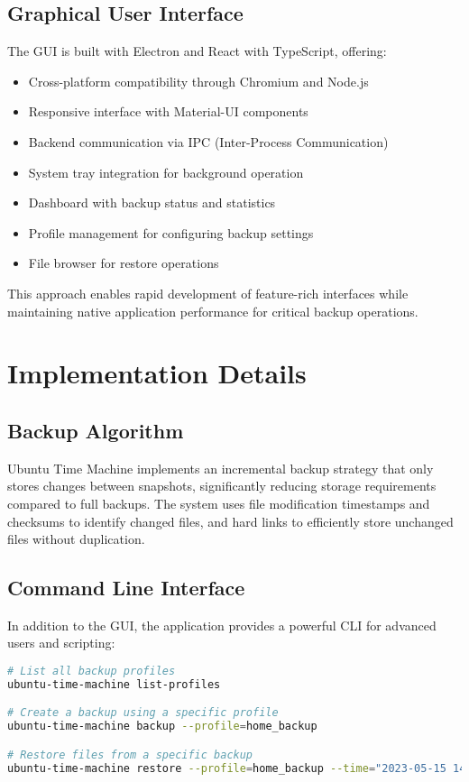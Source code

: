 \documentclass[journal,twoside,10pt]{IEEEtran}
\begin{document}
\subsection{Graphical User Interface}
The GUI is built with Electron and React with TypeScript, offering:
\begin{itemize}
    \item Cross-platform compatibility through Chromium and Node.js
    \item Responsive interface with Material-UI components
    \item Backend communication via IPC (Inter-Process Communication)
    \item System tray integration for background operation
    \item Dashboard with backup status and statistics
    \item Profile management for configuring backup settings
    \item File browser for restore operations
\end{itemize}

This approach enables rapid development of feature-rich interfaces while maintaining native application performance for critical backup operations.

\section{Implementation Details}
\subsection{Backup Algorithm}
Ubuntu Time Machine implements an incremental backup strategy that only stores changes between snapshots, significantly reducing storage requirements compared to full backups. The system uses file modification timestamps and checksums to identify changed files, and hard links to efficiently store unchanged files without duplication.

\subsection{Command Line Interface}
In addition to the GUI, the application provides a powerful CLI for advanced users and scripting:

\begin{lstlisting}[language=bash]
# List all backup profiles
ubuntu-time-machine list-profiles

# Create a backup using a specific profile
ubuntu-time-machine backup --profile=home_backup

# Restore files from a specific backup
ubuntu-time-machine restore --profile=home_backup --time="2023-05-15 14:30" --source="/home/user/Documents" --destination="/tmp/restored"
\end{lstlisting}
\end{document}
